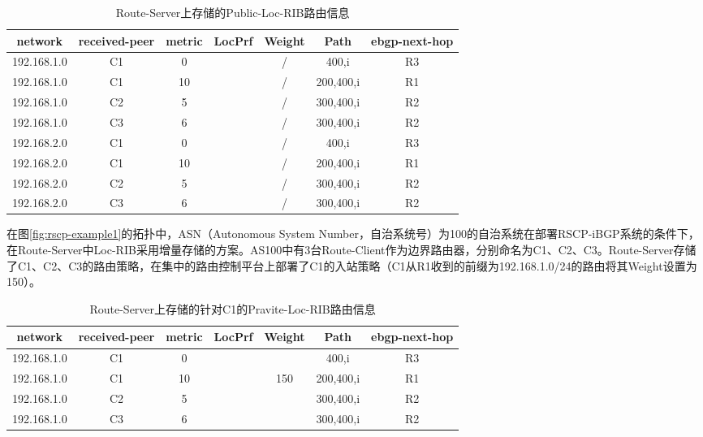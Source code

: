 \begin{table}[h]
	\centering
	\caption{Route-Server上存储的Public-Loc-RIB路由信息}
    \label{tab:weight-example}
	\begin{tabular}{|c|c|c|c|c|c|c|}
		\hline
		network & received-peer & metric & LocPrf & Weight & Path & ebgp-next-hop \\ \hline
		192.168.1.0 & C1 & 0 & & / &400,i & R3 \\ \hline
        192.168.1.0 & C1 & 10 & & / &200,400,i & R1 \\ \hline
        192.168.1.0 & C2 & 5 & & / &300,400,i & R2 \\ \hline
        192.168.1.0 & C3 & 6 & & / &300,400,i & R2 \\ \hline
        192.168.2.0 & C1 & 0 & & / &400,i & R3 \\ \hline
        192.168.2.0 & C1 & 10 & & / &200,400,i & R1 \\ \hline
        192.168.2.0 & C2 & 5 & &  /&300,400,i & R2 \\ \hline
        192.168.2.0 & C3 & 6 & & / &300,400,i & R2 \\ \hline
	\end{tabular}
\end{table}

在图\ref{fig:rscp-example1}的拓扑中，ASN（Autonomous System Number，自治系统号）为100的自治系统在部署RSCP-iBGP系统的条件下，在Route-Server中Loc-RIB采用增量存储的方案。AS100中有3台Route-Client作为边界路由器，分别命名为C1、C2、C3。Route-Server存储了C1、C2、C3的路由策略，在集中的路由控制平台上部署了C1的入站策略（C1从R1收到的前缀为192.168.1.0/24的路由将其Weight设置为150）。



\begin{table}[h]
	\centering
	\caption{Route-Server上存储的针对C1的Pravite-Loc-RIB路由信息}
    \label{tab:c1-loc-rib}
	\begin{tabular}{|c|c|c|c|c|c|c|}
		\hline
		network & received-peer & metric & LocPrf & Weight & Path & ebgp-next-hop \\ \hline
		192.168.1.0 & C1 & 0 & &  &400,i & R3 \\ \hline
        192.168.1.0 & C1 & 10 & & 150 &200,400,i & R1 \\ \hline
        192.168.1.0 & C2 & 5 & &  &300,400,i & R2 \\ \hline
        192.168.1.0 & C3 & 6 & &  &300,400,i & R2 \\ \hline
	\end{tabular}
\end{table}

